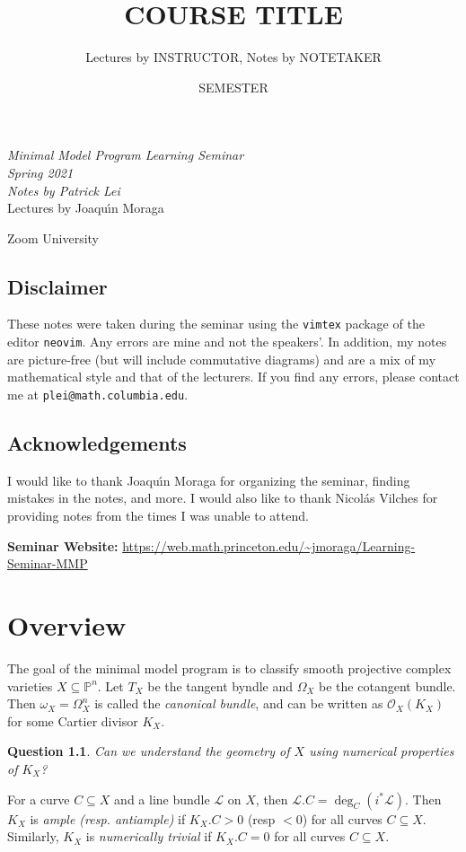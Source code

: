 \documentclass[leqno, openany]{memoir}
\title{COURSE TITLE}
\author{Lectures by INSTRUCTOR, Notes by NOTETAKER}
\date{SEMESTER}
\newtheorem{quest}[thm]{Question}
\theoremstyle{definition}
\theoremstyle{remark}
\theoremstyle{plain}
\theoremstyle{definition}
\theoremstyle{remark}
\renewcommand{\P}{\mathbb{P}}
\newcommand{\msc}[1]{\mathscr{#1}}
\newcommand*{\titleSW}
    {\begingroup%
    \raggedleft
    \vspace*{\baselineskip}
    {\Huge\itshape Minimal Model Program Learning Seminar \\ Spring 2021}\\[\baselineskip]
    {\large\itshape Notes by Patrick Lei}\\[0.2\textheight]
    {\Large Lectures by Joaqu\'{\i}n Moraga}\par
    \vfill
    {\Large \sffamily Zoom University}
    \vspace*{\baselineskip}
\endgroup}
\begin{document}
    
\begin{titlingpage}
\titleSW
\end{titlingpage}

\thispagestyle{empty}
\section*{Disclaimer}%
\label{sec:disclaimer}

These notes were taken during the seminar using the \texttt{vimtex} package of the editor \texttt{neovim}. 
Any errors are mine and not the speakers'. 
In addition, my notes are picture-free (but will include commutative diagrams) and are a mix of my mathematical style and that of the lecturers.
If you find any errors, please contact me at \texttt{plei@math.columbia.edu}.

\section*{Acknowledgements}%
\label{sec:acknowledgements}

I would like to thank Joaqu\'{\i}n Moraga for organizing the seminar, finding mistakes in the notes, and more. I would also like to thank Nicol\'as Vilches for providing notes from the times I was unable to attend.

\vspace*{1cm}

\noindent\textbf{Seminar Website:}  \url{https://web.math.princeton.edu/~jmoraga/Learning-Seminar-MMP}
\newpage


\tableofcontents

\chapter{Overview}%
\label{cha:overview}

The goal of the minimal model program is to classify smooth projective complex varieties $X \subseteq \P^n$. Let $T_X$ be the tangent byndle and $\Omega_X$ be the cotangent bundle. Then $\omega_X = \Omega_X^n$ is called the \textit{canonical bundle}, and can be written as $\msc{O}_X(K_X)$ for some Cartier divisor $K_X$.

\begin{quest}
    Can we understand the geometry of $X$ using numerical properties of $K_X$?
\end{quest}

For a curve $C \subseteq X$ and a line bundle $\msc{L}$ on $X$, then $\msc{L}.C = \deg_C(i^* \msc{L})$. Then $K_X$ is \textit{ample (resp. antiample)} if $K_X . C > 0$ (resp $<0$) for all curves $C \subseteq X$. Similarly, $K_X$ is \textit{numerically trivial} if $K_X . C = 0$ for all curves $C \subseteq X$.
\end{document}
